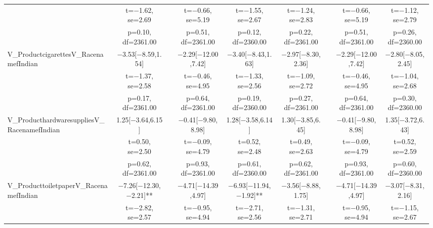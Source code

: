 \documentclass[]{report}
\begin{document}
\begin{table}
{\begin{tabular}[t]{lcccccccc}
		& t=\num{-1.62}, se=\num{2.69} &  & t=\num{-0.66}, se=\num{5.19} & t=\num{-1.55}, se=\num{2.67} & t=\num{-1.24}, se=\num{2.83} &  & t=\num{-0.66}, se=\num{5.19} & t=\num{-1.12}, se=\num{2.79}\\
		& p=\num{0.10}, df=\num{2361.00} &  & p=\num{0.51}, df=\num{2361.00} & p=\num{0.12}, df=\num{2360.00} & p=\num{0.22}, df=\num{2361.00} &  & p=\num{0.51}, df=\num{2361.00} & p=\num{0.26}, df=\num{2360.00}\\
		V\_ProductcigarettesV\_RacenamefIndian & \num{-3.53}[\num{-8.59},\num{1.54}] &  & \num{-2.29}[\num{-12.00},\num{7.42}] & \num{-3.40}[\num{-8.43},\num{1.63}] & \num{-2.97}[\num{-8.30},\num{2.36}] &  & \num{-2.29}[\num{-12.00},\num{7.42}] & \num{-2.80}[\num{-8.05},\num{2.45}]\\
		& t=\num{-1.37}, se=\num{2.58} &  & t=\num{-0.46}, se=\num{4.95} & t=\num{-1.33}, se=\num{2.56} & t=\num{-1.09}, se=\num{2.72} &  & t=\num{-0.46}, se=\num{4.95} & t=\num{-1.04}, se=\num{2.68}\\
		& p=\num{0.17}, df=\num{2361.00} &  & p=\num{0.64}, df=\num{2361.00} & p=\num{0.19}, df=\num{2360.00} & p=\num{0.27}, df=\num{2361.00} &  & p=\num{0.64}, df=\num{2361.00} & p=\num{0.30}, df=\num{2360.00}\\
		V\_ProducthardwaresuppliesV\_RacenamefIndian & \num{1.25}[\num{-3.64},\num{6.15}] &  & \num{-0.41}[\num{-9.80},\num{8.98}] & \num{1.28}[\num{-3.58},\num{6.14}] & \num{1.30}[\num{-3.85},\num{6.45}] &  & \num{-0.41}[\num{-9.80},\num{8.98}] & \num{1.35}[\num{-3.72},\num{6.43}]\\
		& t=\num{0.50}, se=\num{2.50} &  & t=\num{-0.09}, se=\num{4.79} & t=\num{0.52}, se=\num{2.48} & t=\num{0.49}, se=\num{2.63} &  & t=\num{-0.09}, se=\num{4.79} & t=\num{0.52}, se=\num{2.59}\\
		& p=\num{0.62}, df=\num{2361.00} &  & p=\num{0.93}, df=\num{2361.00} & p=\num{0.61}, df=\num{2360.00} & p=\num{0.62}, df=\num{2361.00} &  & p=\num{0.93}, df=\num{2361.00} & p=\num{0.60}, df=\num{2360.00}\\
		V\_ProducttoiletpaperV\_RacenamefIndian & \num{-7.26}[\num{-12.30},\num{-2.21}]** &  & \num{-4.71}[\num{-14.39},\num{4.97}] & \num{-6.93}[\num{-11.94},\num{-1.92}]** & \num{-3.56}[\num{-8.88},\num{1.75}] &  & \num{-4.71}[\num{-14.39},\num{4.97}] & \num{-3.07}[\num{-8.31},\num{2.16}]\\
		& t=\num{-2.82}, se=\num{2.57} &  & t=\num{-0.95}, se=\num{4.94} & t=\num{-2.71}, se=\num{2.56} & t=\num{-1.31}, se=\num{2.71} &  & t=\num{-0.95}, se=\num{4.94} & t=\num{-1.15}, se=\num{2.67}\\

\end{tabular}}
\end{table}
\end{document}
